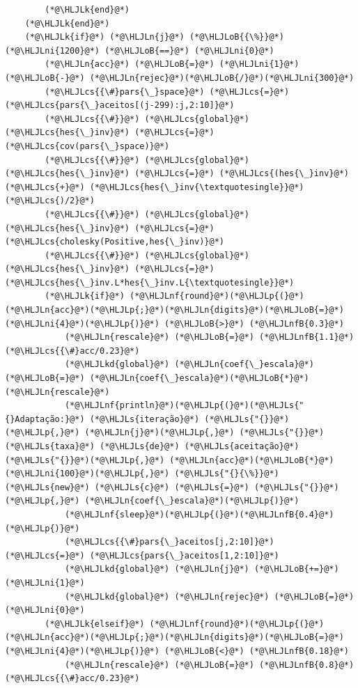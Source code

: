 \documentclass[12pt,a4paper]{article}
\newcommand{\HLJLk}[1]{\textcolor[RGB]{148,91,176}{\textbf{#1}}}
\newcommand{\HLJLkd}[1]{\textcolor[RGB]{214,102,97}{\textit{#1}}}
\newcommand{\HLJLn}[1]{#1}
\newcommand{\HLJLnf}[1]{\textcolor[RGB]{66,102,213}{#1}}
\newcommand{\HLJLs}[1]{\textcolor[RGB]{201,61,57}{#1}}
\newcommand{\HLJLnfB}[1]{\textcolor[RGB]{59,151,46}{#1}}
\newcommand{\HLJLni}[1]{\textcolor[RGB]{59,151,46}{#1}}
\newcommand{\HLJLoB}[1]{\textcolor[RGB]{102,102,102}{\textbf{#1}}}
\newcommand{\HLJLp}[1]{#1}
\newcommand{\HLJLcs}[1]{\textcolor[RGB]{153,153,119}{\textit{#1}}}
\begin{document}
\begin{lstlisting}
        (*@\HLJLk{end}@*)
    (*@\HLJLk{end}@*)
    (*@\HLJLk{if}@*) (*@\HLJLn{j}@*) (*@\HLJLoB{{\%}}@*) (*@\HLJLni{1200}@*) (*@\HLJLoB{==}@*) (*@\HLJLni{0}@*)
        (*@\HLJLn{acc}@*) (*@\HLJLoB{=}@*) (*@\HLJLni{1}@*) (*@\HLJLoB{-}@*) (*@\HLJLn{rejec}@*)(*@\HLJLoB{/}@*)(*@\HLJLni{300}@*)
        (*@\HLJLcs{{\#}pars{\_}space}@*) (*@\HLJLcs{=}@*) (*@\HLJLcs{pars{\_}aceitos[(j-299):j,2:10]}@*)
        (*@\HLJLcs{{\#}}@*) (*@\HLJLcs{global}@*) (*@\HLJLcs{hes{\_}inv}@*) (*@\HLJLcs{=}@*) (*@\HLJLcs{cov(pars{\_}space)}@*)
        (*@\HLJLcs{{\#}}@*) (*@\HLJLcs{global}@*) (*@\HLJLcs{hes{\_}inv}@*) (*@\HLJLcs{=}@*) (*@\HLJLcs{(hes{\_}inv}@*) (*@\HLJLcs{+}@*) (*@\HLJLcs{hes{\_}inv{\textquotesingle}}@*) (*@\HLJLcs{)/2}@*)
        (*@\HLJLcs{{\#}}@*) (*@\HLJLcs{global}@*) (*@\HLJLcs{hes{\_}inv}@*) (*@\HLJLcs{=}@*) (*@\HLJLcs{cholesky(Positive,hes{\_}inv)}@*)
        (*@\HLJLcs{{\#}}@*) (*@\HLJLcs{global}@*) (*@\HLJLcs{hes{\_}inv}@*) (*@\HLJLcs{=}@*) (*@\HLJLcs{hes{\_}inv.L*hes{\_}inv.L{\textquotesingle}}@*)
        (*@\HLJLk{if}@*) (*@\HLJLnf{round}@*)(*@\HLJLp{(}@*)(*@\HLJLn{acc}@*)(*@\HLJLp{;}@*)(*@\HLJLn{digits}@*)(*@\HLJLoB{=}@*)(*@\HLJLni{4}@*)(*@\HLJLp{)}@*) (*@\HLJLoB{>}@*) (*@\HLJLnfB{0.3}@*)
            (*@\HLJLn{rescale}@*) (*@\HLJLoB{=}@*) (*@\HLJLnfB{1.1}@*)(*@\HLJLcs{{\#}acc/0.23}@*)
            (*@\HLJLkd{global}@*) (*@\HLJLn{coef{\_}escala}@*) (*@\HLJLoB{=}@*) (*@\HLJLn{coef{\_}escala}@*)(*@\HLJLoB{*}@*)(*@\HLJLn{rescale}@*)
            (*@\HLJLnf{println}@*)(*@\HLJLp{(}@*)(*@\HLJLs{"{}Adaptação:}@*) (*@\HLJLs{iteração}@*) (*@\HLJLs{"{}}@*)(*@\HLJLp{,}@*) (*@\HLJLn{j}@*)(*@\HLJLp{,}@*) (*@\HLJLs{"{}}@*) (*@\HLJLs{taxa}@*) (*@\HLJLs{de}@*) (*@\HLJLs{aceitação}@*) (*@\HLJLs{"{}}@*)(*@\HLJLp{,}@*) (*@\HLJLn{acc}@*)(*@\HLJLoB{*}@*)(*@\HLJLni{100}@*)(*@\HLJLp{,}@*) (*@\HLJLs{"{}{\%}}@*) (*@\HLJLs{new}@*) (*@\HLJLs{c}@*) (*@\HLJLs{=}@*) (*@\HLJLs{"{}}@*)(*@\HLJLp{,}@*) (*@\HLJLn{coef{\_}escala}@*)(*@\HLJLp{)}@*)
            (*@\HLJLnf{sleep}@*)(*@\HLJLp{(}@*)(*@\HLJLnfB{0.4}@*)(*@\HLJLp{)}@*)
            (*@\HLJLcs{{\#}pars{\_}aceitos[j,2:10]}@*) (*@\HLJLcs{=}@*) (*@\HLJLcs{pars{\_}aceitos[1,2:10]}@*)
            (*@\HLJLkd{global}@*) (*@\HLJLn{j}@*) (*@\HLJLoB{+=}@*) (*@\HLJLni{1}@*)
            (*@\HLJLkd{global}@*) (*@\HLJLn{rejec}@*) (*@\HLJLoB{=}@*) (*@\HLJLni{0}@*)
        (*@\HLJLk{elseif}@*) (*@\HLJLnf{round}@*)(*@\HLJLp{(}@*)(*@\HLJLn{acc}@*)(*@\HLJLp{;}@*)(*@\HLJLn{digits}@*)(*@\HLJLoB{=}@*)(*@\HLJLni{4}@*)(*@\HLJLp{)}@*) (*@\HLJLoB{<}@*) (*@\HLJLnfB{0.18}@*)
            (*@\HLJLn{rescale}@*) (*@\HLJLoB{=}@*) (*@\HLJLnfB{0.8}@*)(*@\HLJLcs{{\#}acc/0.23}@*)

\end{lstlisting}
\end{document}
